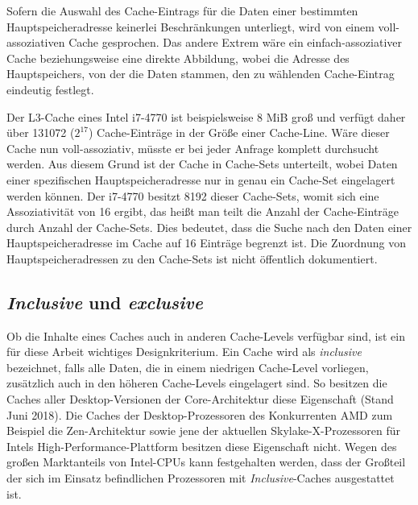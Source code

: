 Sofern die Auswahl des Cache-Eintrags für die Daten einer bestimmten Hauptspeicheradresse keinerlei Beschränkungen unterliegt, wird von einem voll-assoziativen Cache gesprochen. 
Das andere Extrem wäre ein einfach-assoziativer Cache beziehungsweise eine direkte Abbildung, wobei die Adresse des Hauptspeichers, von der die Daten stammen, den zu wählenden Cache-Eintrag eindeutig festlegt.

Der L3-Cache eines Intel i7-4770 ist beispielsweise 8 MiB groß und verfügt daher über 131072 ($2^{17}$) Cache-Einträge in der Größe einer Cache-Line. 
Wäre dieser Cache nun voll-assoziativ, müsste er bei jeder Anfrage komplett durchsucht werden. Aus diesem Grund ist der Cache in Cache-Sets unterteilt, wobei Daten einer spezifischen Hauptspeicheradresse nur in genau ein Cache-Set eingelagert werden können. 
Der i7-4770 besitzt 8192 dieser Cache-Sets, womit sich eine Assoziativität von 16 ergibt, das heißt man teilt die Anzahl der Cache-Einträge durch Anzahl der Cache-Sets. Dies bedeutet, dass die Suche nach den Daten einer Hauptspeicheradresse im Cache auf 16 Einträge begrenzt ist. 
Die Zuordnung von Hauptspeicheradressen zu den Cache-Sets ist nicht öffentlich dokumentiert.


\subsection{\textit{Inclusive} und \textit{exclusive}}
Ob die Inhalte eines Caches auch in anderen Cache-Levels verfügbar sind, ist ein für diese Arbeit wichtiges Designkriterium. Ein Cache wird als \textit{inclusive} bezeichnet, falls alle Daten, die in einem niedrigen Cache-Level vorliegen, zusätzlich auch in den höheren Cache-Levels eingelagert sind. 
So besitzen die Caches aller Desktop-Versionen der Core-Architektur diese Eigenschaft (Stand Juni 2018). 
Die Caches der Desktop-Prozessoren des Konkurrenten AMD zum Beispiel die Zen-Architektur \cite{CacheRyzen} sowie jene der aktuellen Skylake-X-Prozessoren \cite{CacheSkylakeX} für Intels High-Performance-Plattform besitzen diese Eigenschaft nicht.
Wegen des großen Marktanteils von Intel-CPUs kann festgehalten werden, dass der Großteil der sich im Einsatz befindlichen Prozessoren mit \textit{Inclusive}-Caches ausgestattet ist.

